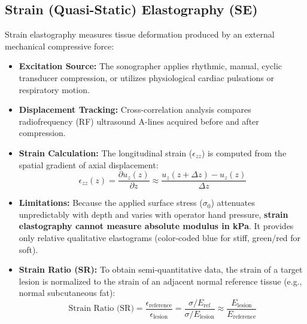 \documentclass[11pt,a4paper]{article}
\begin{document}
\subsection{Strain (Quasi-Static) Elastography (SE)}
Strain elastography measures tissue deformation produced by an external mechanical compressive force:
\begin{itemize}[leftmargin=2em]
    \item \textbf{Excitation Source:} The sonographer applies rhythmic, manual, cyclic transducer compression, or utilizes physiological cardiac pulsations or respiratory motion.
    \item \textbf{Displacement Tracking:} Cross-correlation analysis compares radiofrequency (RF) ultrasound A-lines acquired before and after compression.
    \item \textbf{Strain Calculation:} The longitudinal strain ($\epsilon_{zz}$) is computed from the spatial gradient of axial displacement:
    \begin{equation}
        \epsilon_{zz}(z) = \frac{\partial u_z(z)}{\partial z} \approx \frac{u_z(z + \Delta z) - u_z(z)}{\Delta z}
    \end{equation}
    \item \textbf{Limitations:} Because the applied surface stress ($\sigma_0$) attenuates unpredictably with depth and varies with operator hand pressure, \textbf{strain elastography cannot measure absolute modulus in kPa}. It provides only relative qualitative elastograms (color-coded blue for stiff, green/red for soft).
    \item \textbf{Strain Ratio (SR):} To obtain semi-quantitative data, the strain of a target lesion is normalized to the strain of an adjacent normal reference tissue (e.g., normal subcutaneous fat):
    \begin{equation}
        \text{Strain Ratio (SR)} = \frac{\epsilon_{\text{reference}}}{\epsilon_{\text{lesion}}} = \frac{\sigma / E_{\text{ref}}}{\sigma / E_{\text{lesion}}} \approx \frac{E_{\text{lesion}}}{E_{\text{reference}}}
    \end{equation}
\end{itemize}
\end{document}
